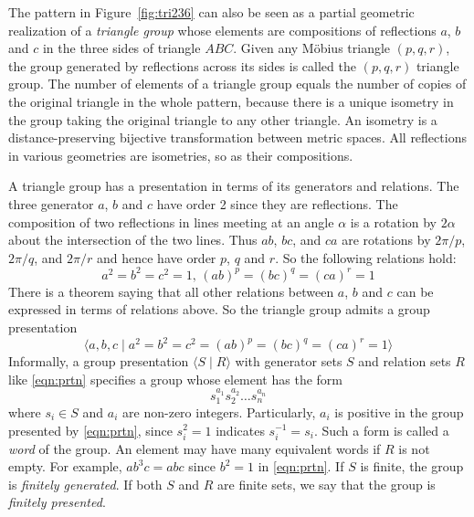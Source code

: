 \documentclass[12pt]{article}
\begin{document}
The pattern in Figure~\ref{fig:tri236} can also be seen as a partial
geometric realization of a \emph{triangle group} whose elements are
compositions of reflections $a$, $b$ and $c$ in the three sides of
triangle $ABC$. Given any M\"obius triangle $(p, q, r)$, the group
generated by reflections across its sides is called the $(p, q, r)$
triangle group. The number of elements of a triangle group equals the
number of copies of the original triangle in the whole pattern,
because there is a unique isometry in the group taking the original
triangle to any other triangle. An isometry is a distance-preserving
bijective transformation between metric spaces. All reflections in
various geometries are isometries, so as their compositions.

A triangle group has a presentation in terms of its generators and
relations. The three generator $a$, $b$ and $c$ have order 2 since
they are reflections. The composition of two reflections in lines
meeting at an angle $\alpha$ is a rotation by $2\alpha$ about the
intersection of the two lines. Thus $ab$, $bc$, and $ca$ are rotations
by $2\pi/p$, $2\pi/q$, and $2\pi/r$ and hence have order $p$, $q$ and
$r$. So the following relations hold:
\begin{equation*}
  a^2 = b^2 = c^2 = 1,\, (ab)^p = (bc)^q = (ca)^r = 1
\end{equation*}
There is a theorem saying that all other relations between $a$, $b$
and $c$ can be expressed in terms of relations above. So the triangle
group admits a group presentation
\begin{equation}\label{eqn:prtn}
  \langle a, b, c \mid a^2 = b^2 = c^2 = (ab)^p = (bc)^q = (ca)^r = 1\rangle
\end{equation}
Informally, a group presentation $\langle S \mid R \rangle$ with
generator sets $S$ and relation sets $R$ like \eqref{eqn:prtn}
specifies a group whose element has the form
\begin{equation*}
  s_1^{a_1}s_2^{a_2}\dots s_n^{a_n}
\end{equation*}
where $s_i\in S$ and $a_i$ are non-zero integers. Particularly, $a_i$
is positive in the group presented by \eqref{eqn:prtn}, since
$s_i^2=1$ indicates $s_i^{-1}=s_i$. Such a form is called a
\emph{word} of the group. An element may have many equivalent words if
$R$ is not empty. For example, $ab^3c=abc$ since $b^2=1$ in
\eqref{eqn:prtn}. If $S$ is finite, the group is \emph{finitely
generated}. If both $S$ and $R$ are finite sets, we say that the group
is \emph{finitely presented}.
\end{document}
